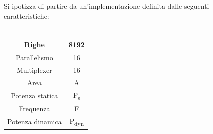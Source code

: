 \documentclass[11pt,  english, makeidx, a4paper, titlepage, oneside]{book}
\begin{document}
\\\\
Si ipotizza di partire da un'implementazione definita dalle seguenti caratteristiche:
\\\\
\begin{center}
	\begin{tabular}{|c|c|}
	\hline
	Righe & 8192\\
	\hline
	Parallelismo & 16\\
	\hline
	Multiplexer & 16\\
	\hline
	Area & A\\
	\hline
	Potenza statica & P\textsubscript{s}\\
	\hline
	Frequenza & F\\
	\hline
	Potenza dinamica & P\textsubscript{dyn}\\
	\hline
	\end{tabular}	
\end{center}
\vspace{0.3cm}
\end{document}
